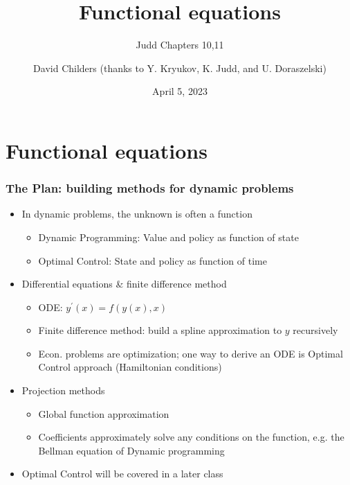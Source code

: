 \documentclass[bigger,handout]{beamer}
\begin{document}
\title[47-809: Functional Eq's]{Functional equations}
\subtitle{Judd Chapters 10,11}
\author[David Childers]{David Childers (thanks to Y. Kryukov, K. Judd, and U. Doraszelski)}
\date[Apr.5]{April 5, 2023}
\maketitle

\section{Functional equations}

 
 
\begin{frame}%
  
\frametitle{The Plan: building methods for dynamic problems}

\begin{itemize}
\item In dynamic problems, the unknown is often a function

\begin{itemize}
\item Dynamic Programming: Value and policy as function of state

\item Optimal Control: State and policy as function of time
\end{itemize}

\item Differential equations \& finite difference method

\begin{itemize}
\item ODE: $y^{\prime }\left( x\right) =f\left( y\left( x\right) ,x\right) $

\item Finite difference method: build a spline approximation to $y$ recursively

\item Econ. problems are optimization; one way to derive an ODE is Optimal
Control approach (Hamiltonian conditions)
\end{itemize}

\item Projection methods

\begin{itemize}
\item Global function approximation

\item Coefficients approximately solve any conditions on the function,\newline
e.g. the Bellman equation of Dynamic programming
\end{itemize}

\item Optimal Control will be covered in a later class
\end{itemize}

  
 
\end{frame}%
  
\end{document}
